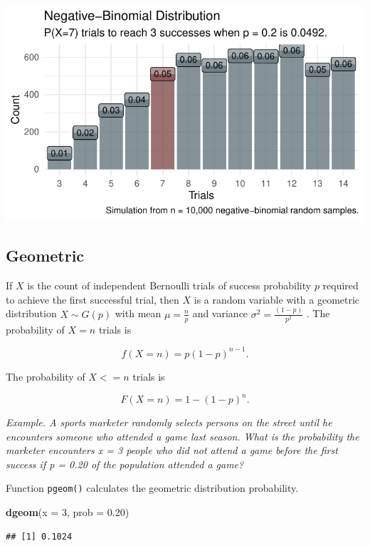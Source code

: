 \documentclass[
]{book}
\newenvironment{Shaded}{\begin{snugshade}}{\end{snugshade}}
\newcommand{\DataTypeTok}[1]{\textcolor[rgb]{0.13,0.29,0.53}{#1}}
\newcommand{\DecValTok}[1]{\textcolor[rgb]{0.00,0.00,0.81}{#1}}
\newcommand{\FloatTok}[1]{\textcolor[rgb]{0.00,0.00,0.81}{#1}}
\newcommand{\KeywordTok}[1]{\textcolor[rgb]{0.13,0.29,0.53}{\textbf{#1}}}
\newcommand{\NormalTok}[1]{#1}
\begin{document}
\includegraphics{data-sci_files/figure-latex/unnamed-chunk-10-1.pdf}

\hypertarget{geometric}{%
\subsection{Geometric}\label{geometric}}

If \(X\) is the count of independent Bernoulli trials of success probability \(p\) required to achieve the first successful trial, then \(X\) is a random variable with a geometric distribution \(X \sim G(p)\) with mean \(\mu=\frac{{n}}{{p}}\) and variance \(\sigma^2 = \frac{{(1-p)}}{{p^2}}\) . The probability of \(X=n\) trials is

\[f(X=n) = p(1-p)^{n-1}.\]

The probability of \(X<=n\) trials is

\[F(X=n) = 1 - (1-p)^n.\]

\emph{Example. A sports marketer randomly selects persons on the street until he encounters someone who attended a game last season. What is the probability the marketer encounters x = 3 people who did not attend a game before the first success if p = 0.20 of the population attended a game?}

Function \texttt{pgeom()} calculates the geometric distribution probability.

\begin{Shaded}
\begin{Highlighting}[]
\KeywordTok{dgeom}\NormalTok{(}\DataTypeTok{x =} \DecValTok{3}\NormalTok{, }\DataTypeTok{prob =} \FloatTok{0.20}\NormalTok{)}
\end{Highlighting}
\end{Shaded}

\begin{verbatim}
## [1] 0.1024
\end{verbatim}
\end{document}
